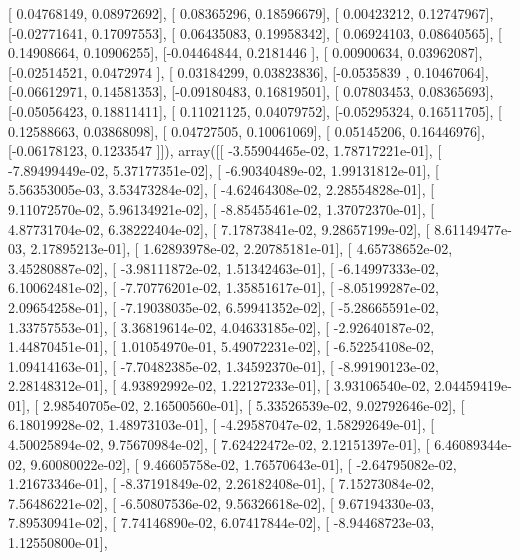 \documentclass{article}
\begin{document}
       [ 0.04768149,  0.08972692],
       [ 0.08365296,  0.18596679],
       [ 0.00423212,  0.12747967],
       [-0.02771641,  0.17097553],
       [ 0.06435083,  0.19958342],
       [ 0.06924103,  0.08640565],
       [ 0.14908664,  0.10906255],
       [-0.04464844,  0.2181446 ],
       [ 0.00900634,  0.03962087],
       [-0.02514521,  0.0472974 ],
       [ 0.03184299,  0.03823836],
       [-0.0535839 ,  0.10467064],
       [-0.06612971,  0.14581353],
       [-0.09180483,  0.16819501],
       [ 0.07803453,  0.08365693],
       [-0.05056423,  0.18811411],
       [ 0.11021125,  0.04079752],
       [-0.05295324,  0.16511705],
       [ 0.12588663,  0.03868098],
       [ 0.04727505,  0.10061069],
       [ 0.05145206,  0.16446976],
       [-0.06178123,  0.1233547 ]]), array([[ -3.55904465e-02,   1.78717221e-01],
       [ -7.89499449e-02,   5.37177351e-02],
       [ -6.90340489e-02,   1.99131812e-01],
       [  5.56353005e-03,   3.53473284e-02],
       [ -4.62464308e-02,   2.28554828e-01],
       [  9.11072570e-02,   5.96134921e-02],
       [ -8.85455461e-02,   1.37072370e-01],
       [  4.87731704e-02,   6.38222404e-02],
       [  7.17873841e-02,   9.28657199e-02],
       [  8.61149477e-03,   2.17895213e-01],
       [  1.62893978e-02,   2.20785181e-01],
       [  4.65738652e-02,   3.45280887e-02],
       [ -3.98111872e-02,   1.51342463e-01],
       [ -6.14997333e-02,   6.10062481e-02],
       [ -7.70776201e-02,   1.35851617e-01],
       [ -8.05199287e-02,   2.09654258e-01],
       [ -7.19038035e-02,   6.59941352e-02],
       [ -5.28665591e-02,   1.33757553e-01],
       [  3.36819614e-02,   4.04633185e-02],
       [ -2.92640187e-02,   1.44870451e-01],
       [  1.01054970e-01,   5.49072231e-02],
       [ -6.52254108e-02,   1.09414163e-01],
       [ -7.70482385e-02,   1.34592370e-01],
       [ -8.99190123e-02,   2.28148312e-01],
       [  4.93892992e-02,   1.22127233e-01],
       [  3.93106540e-02,   2.04459419e-01],
       [  2.98540705e-02,   2.16500560e-01],
       [  5.33526539e-02,   9.02792646e-02],
       [  6.18019928e-02,   1.48973103e-01],
       [ -4.29587047e-02,   1.58292649e-01],
       [  4.50025894e-02,   9.75670984e-02],
       [  7.62422472e-02,   2.12151397e-01],
       [  6.46089344e-02,   9.60080022e-02],
       [  9.46605758e-02,   1.76570643e-01],
       [ -2.64795082e-02,   1.21673346e-01],
       [ -8.37191849e-02,   2.26182408e-01],
       [  7.15273084e-02,   7.56486221e-02],
       [ -6.50807536e-02,   9.56326618e-02],
       [  9.67194330e-03,   7.89530941e-02],
       [  7.74146890e-02,   6.07417844e-02],
       [ -8.94468723e-03,   1.12550800e-01],
\end{document}
